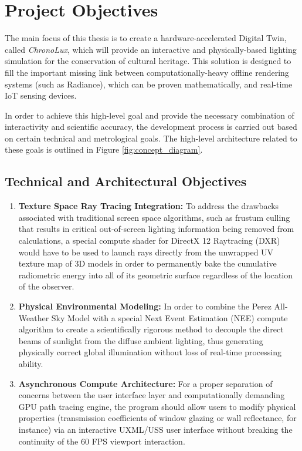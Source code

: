 \chapter{Project Objectives}\label{ch:obiective}
\pagestyle{fancy}

The main focus of this thesis is to create a hardware-accelerated Digital Twin, called \textit{ChronoLux}, which will provide an interactive and physically-based lighting simulation for the conservation of cultural heritage. This solution is designed to fill the important missing link between computationally-heavy offline rendering systems (such as Radiance), which can be proven mathematically, and real-time IoT sensing devices.

In order to achieve this high-level goal and provide the necessary combination of interactivity and scientific accuracy, the development process is carried out based on certain technical and metrological goals. The high-level architecture related to these goals is outlined in Figure \ref{fig:concept_diagram}.

\section{Technical and Architectural Objectives}

\begin{enumerate}[label=\textbf{O\arabic*.}]
    \item \textbf{Texture Space Ray Tracing Integration:}
          To address the drawbacks associated with traditional screen space algorithms, such as frustum culling that results in critical out-of-screen lighting information being removed from calculations, a special compute shader for DirectX 12 Raytracing (DXR) would have to be used to launch rays directly from the unwrapped UV texture map of 3D models in order to permanently bake the cumulative radiometric energy into all of its geometric surface regardless of the location of the observer.

    \item \textbf{Physical Environmental Modeling:}
          In order to combine the Perez All-Weather Sky Model with a special Next Event Estimation (NEE) compute algorithm to create a scientifically rigorous method to decouple the direct beams of sunlight from the diffuse ambient lighting, thus generating physically correct global illumination without loss of real-time processing ability.

    \item \textbf{Asynchronous Compute Architecture:}
          For a proper separation of concerns between the user interface layer and computationally demanding GPU path tracing engine, the program should allow users to modify physical properties (transmission coefficients of window glazing or wall reflectance, for instance) via an interactive UXML/USS user interface without breaking the continuity of the 60 FPS viewport interaction.

\end{enumerate}

